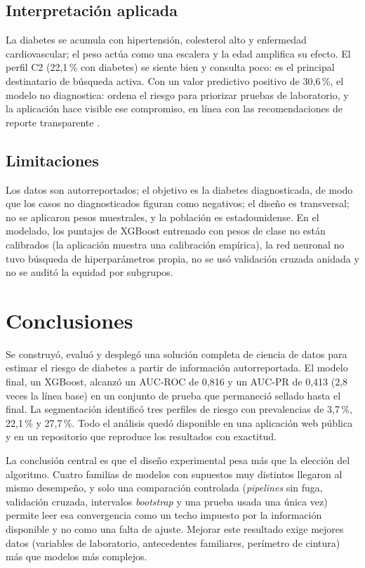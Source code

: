 \documentclass[conference,a4paper]{IEEEtran}
\begin{document}
\subsection{Interpretación aplicada}
La diabetes se acumula con hipertensión, colesterol alto y enfermedad cardiovascular; el peso actúa como una escalera y la edad amplifica su efecto. El perfil C2 (22,1\,\% con diabetes) se siente bien y consulta poco: es el principal destinatario de búsqueda activa. Con un valor predictivo positivo de 30,6\,\%, el modelo no diagnostica: ordena el riesgo para priorizar pruebas de laboratorio, y la aplicación hace visible ese compromiso, en línea con las recomendaciones de reporte transparente \citep{collins2015}.

\subsection{Limitaciones}
Los datos son autorreportados; el objetivo es la diabetes diagnosticada, de modo que los casos no diagnosticados figuran como negativos; el diseño es transversal; no se aplicaron pesos muestrales, y la población es estadounidense. En el modelado, los puntajes de XGBoost entrenado con pesos de clase no están calibrados \citep{vancalster2019} (la aplicación muestra una calibración empírica), la red neuronal no tuvo búsqueda de hiperparámetros propia, no se usó validación cruzada anidada y no se auditó la equidad por subgrupos.

\section{Conclusiones}
Se construyó, evaluó y desplegó una solución completa de ciencia de datos para estimar el riesgo de diabetes a partir de información autorreportada. El modelo final, un XGBoost, alcanzó un AUC-ROC de 0,816 y un AUC-PR de 0,413 (2,8 veces la línea base) en un conjunto de prueba que permaneció sellado hasta el final. La segmentación identificó tres perfiles de riesgo con prevalencias de 3,7\,\%, 22,1\,\% y 27,7\,\%. Todo el análisis quedó disponible en una aplicación web pública y en un repositorio que reproduce los resultados con exactitud.

La conclusión central es que el diseño experimental pesa más que la elección del algoritmo. Cuatro familias de modelos con supuestos muy distintos llegaron al mismo desempeño, y solo una comparación controlada (\textit{pipelines} sin fuga, validación cruzada, intervalos \textit{bootstrap} y una prueba usada una única vez) permite leer esa convergencia como un techo impuesto por la información disponible y no como una falta de ajuste. Mejorar este resultado exige mejores datos (variables de laboratorio, antecedentes familiares, perímetro de cintura) más que modelos más complejos.
\end{document}
